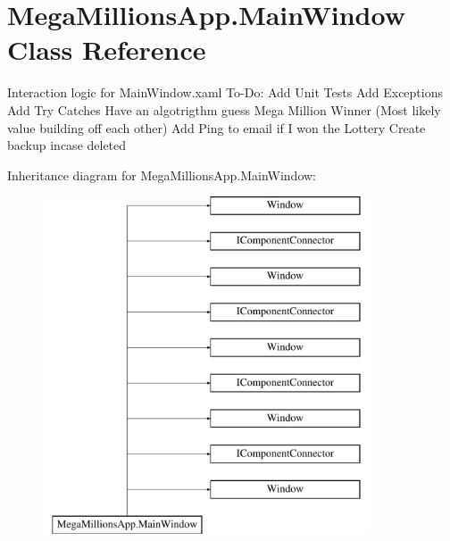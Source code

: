 \hypertarget{class_mega_millions_app_1_1_main_window}{}\section{Mega\+Millions\+App.\+Main\+Window Class Reference}
\label{class_mega_millions_app_1_1_main_window}


Interaction logic for Main\+Window.\+xaml To-\/\+Do\+: Add Unit Tests Add Exceptions Add Try Catches Have an algotrigthm guess Mega Million Winner (Most likely value building off each other) Add Ping to email if I won the Lottery Create backup incase deleted  


Inheritance diagram for Mega\+Millions\+App.\+Main\+Window\+:\begin{figure}[H]
\begin{center}
\leavevmode
\includegraphics[height=10.000000cm]{class_mega_millions_app_1_1_main_window}
\end{center}
\end{figure}
